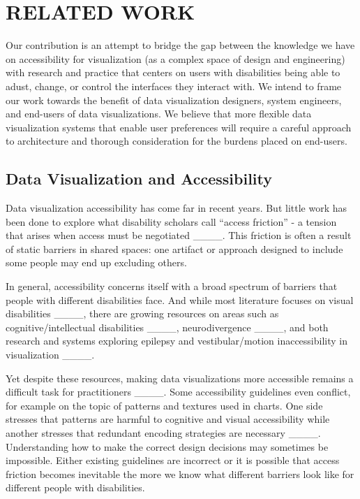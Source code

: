 \section{RELATED WORK}
Our contribution is an attempt to bridge the gap between the knowledge we have on accessibility for visualization (as a complex space of design and engineering) with research and practice that centers on users with disabilities being able to adust, change, or control the interfaces they interact with. We intend to frame our work towards the benefit of data visualization designers, system engineers, and end-users of data visualizations. We believe that more flexible data visualization systems that enable user preferences will require a careful approach to architecture and thorough consideration for the burdens placed on end-users.

\subsection{Data Visualization and Accessibility}
Data visualization accessibility has come far in recent years. But little work has been done to explore what disability scholars call ``access friction'' - a tension that arises when access must be negotiated ____. This friction is often a result of static barriers in shared spaces: one artifact or approach designed to include some people may end up excluding others.

In general, accessibility concerns itself with a broad spectrum of barriers that people with different disabilities face. And while most literature focuses on visual disabilities ____, there are growing resources on areas such as cognitive/intellectual disabilities ____, neurodivergence ____, and both research and systems exploring epilepsy and vestibular/motion inaccessibility in visualization ____.


Yet despite these resources, making data visualizations more accessible remains a difficult task for practitioners ____. Some accessibility guidelines even conflict, for example on the topic of patterns and textures used in charts. One side stresses that patterns are harmful to cognitive and visual accessibility while another stresses that redundant encoding strategies are necessary ____. Understanding how to make the correct design decisions may sometimes be impossible. Either existing guidelines are incorrect or it is possible that access friction becomes inevitable the more we know what different barriers look like for different people with disabilities.

